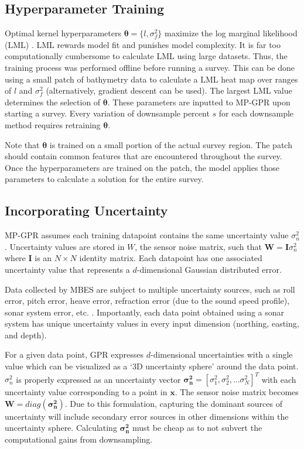 \subsection{Hyperparameter Training}\label{handling_hyperparameters}

Optimal kernel hyperparameters $\boldsymbol{\theta} = \{l,\sigma_f^2\}$ maximize the log marginal likelihood (LML) \cite{Rasmussen2006}. LML rewards model fit and punishes model complexity. It is far too computationally cumbersome to calculate LML using large datasets. Thus, the training process was performed offline before running a survey. This can be done using a small patch of bathymetry data to calculate a LML heat map over ranges of $l$ and $\sigma_f^2$ (alternatively, gradient descent can be used). The largest LML value determines the selection of $\boldsymbol{\theta}$. These parameters are inputted to MP-GPR upon starting a survey. Every variation of downsample percent $s$ for each downsample method requires retraining $\boldsymbol{\theta}$.

Note that $\boldsymbol{\theta}$ is trained on a small portion of the actual survey region. The patch should contain common features that are encountered throughout the survey. Once the hyperparameters are trained on the patch, the model applies those parameters to calculate a solution for the entire survey.

\subsection{Incorporating Uncertainty}\label{sec:uncerainty_considerations}

MP-GPR assumes each training datapoint contains the same uncertainty value $\sigma_n^2$. Uncertainty values are stored in $W$, the sensor noise matrix, such that $\boldsymbol{W} = \boldsymbol{I} \sigma_n^2$ where $\boldsymbol{I}$ is an $N \times N$ identity  matrix. Each datapoint has one associated uncertainty value that represents a $d$-dimensional Gaussian distributed error. 

Data collected by MBES are subject to multiple uncertainty sources, such as roll error, pitch error, heave error, refraction error (due to the sound speed profile), sonar system error, etc. \cite{HareMBES1995}. Importantly, each data point obtained using a sonar system has unique uncertainty values in every input dimension (northing, easting, and depth). 

For a given data point, GPR expresses $d$-dimensional uncertainties with a single value which can be visualized as a `3D uncertainty sphere' around the data point. $\sigma_n^2$ is properly expressed as an uncertainty vector $\boldsymbol{\sigma_n^2} = [\sigma_1^2, \sigma_2^2, ... \sigma_N^2]^T$ with each uncertainty value corresponding to a point in $\boldsymbol{x}$. The sensor noise matrix becomes $\boldsymbol{W} = diag(\boldsymbol{\sigma_n^2})$. Due to this formulation, capturing the dominant sources of uncertainty will include secondary error sources in other dimensions within the uncertainty sphere. Calculating $\boldsymbol{\sigma_n^2}$ must be cheap as to not subvert the computational gains from downsampling.  

